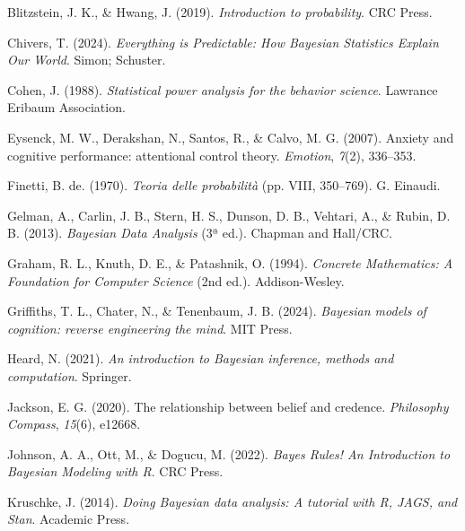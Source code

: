\documentclass[
  italian,
  letterpaper,
  a4paper,
  11pt,
  open=any]{scrbook}
\newlength{\cslhangindent}
\newenvironment{CSLReferences}[2] %
 {\begin{list}{}{%
  \setlength{\itemindent}{0pt}
  \setlength{\leftmargin}{0pt}
  \setlength{\parsep}{0pt}
  \ifodd #1
   \setlength{\leftmargin}{\cslhangindent}
   \setlength{\itemindent}{-1\cslhangindent}
  \fi
  \setlength{\itemsep}{#2\baselineskip}}}
 {\end{list}}
\theoremstyle{plain}
\theoremstyle{definition}
\theoremstyle{definition}
\theoremstyle{remark}
\begin{document}
\protect{}\label{refs}
\begin{CSLReferences}{1}{0}
Blitzstein, J. K., \& Hwang, J. (2019). \emph{Introduction to
probability}. CRC Press.

Chivers, T. (2024). \emph{Everything is Predictable: How Bayesian
Statistics Explain Our World}. Simon; Schuster.

Cohen, J. (1988). \emph{Statistical power analysis for the behavior
science}. Lawrance Eribaum Association.

Eysenck, M. W., Derakshan, N., Santos, R., \& Calvo, M. G. (2007).
Anxiety and cognitive performance: attentional control theory.
\emph{Emotion}, \emph{7}(2), 336--353.

Finetti, B. de. (1970). \emph{Teoria delle probabilità} (pp. VIII,
350--769). G. Einaudi.

Gelman, A., Carlin, J. B., Stern, H. S., Dunson, D. B., Vehtari, A., \&
Rubin, D. B. (2013). \emph{Bayesian Data Analysis} (3ª ed.). {Chapman
and Hall/CRC}.

Graham, R. L., Knuth, D. E., \& Patashnik, O. (1994). \emph{Concrete
Mathematics: A Foundation for Computer Science} (2nd ed.).
Addison-Wesley.

Griffiths, T. L., Chater, N., \& Tenenbaum, J. B. (2024). \emph{Bayesian
models of cognition: reverse engineering the mind}. MIT Press.

Heard, N. (2021). \emph{An introduction to Bayesian inference, methods
and computation}. Springer.

Jackson, E. G. (2020). The relationship between belief and credence.
\emph{Philosophy Compass}, \emph{15}(6), e12668.

Johnson, A. A., Ott, M., \& Dogucu, M. (2022). \emph{{Bayes Rules! An
Introduction to Bayesian Modeling with R}}. CRC Press.

Kruschke, J. (2014). \emph{Doing Bayesian data analysis: {A} tutorial
with {R}, JAGS, and {Stan}}. Academic Press.


\end{CSLReferences}
\end{document}

